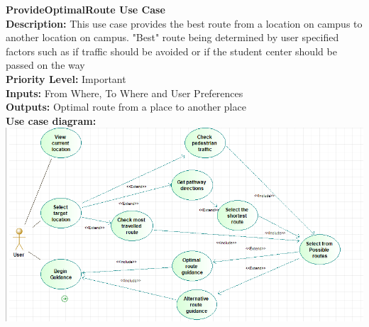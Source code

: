 \documentclass[a4paper,12pt]{article}
\begin{document}
\textbf{\large ProvideOptimalRoute Use Case}\\
\textbf{Description: } This use case provides the best route from a location on campus to another location on campus. "Best" route being determined by user specified factors such as if traffic should be avoided or if the student center should be passed on the way\\
\textbf{Priority Level: } Important\\
\textbf{Inputs:} From Where, To Where and User Preferences\\
\textbf{Outputs:} Optimal route from a place to another place\\
\textbf{Use case diagram: }\\
\includegraphics[width=\textwidth]{images/op_route.png}

\newpage
\end{document}
